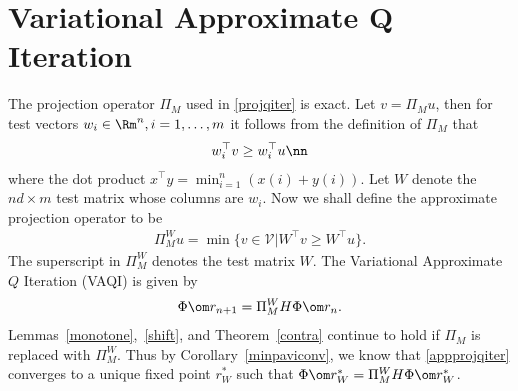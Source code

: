 \section{Variational Approximate Q Iteration}\label{weakproj}
The projection operator $\Pi_M$ used in \eqref{projqiter} is exact. Let $v=\Pi_M u$, then for test vectors $w_i \in \Rm^n, i=1,\ldots,m$ it follows from the definition of $\Pi_M$ that
\begin{align}
w_i^\top v\geq w_i^\top u\nn
\end{align}
where the dot product $x^\top y=\min^n_{i=1}(x(i)+y(i))$. Let $W$ denote the $nd\times m$ test matrix whose columns are $w_i$. Now we shall define the approximate projection operator to be
\begin{align}\label{appproj}
\Pi^W_M u=\min\{v \in \mathcal{V}| W^\top v\geq W^\top u \}.
\end{align}
The superscript in $\Pi_M^W$ denotes the test matrix $W$. The Variational Approximate $Q$ Iteration (VAQI) is given by
\begin{align}\label{appprojqiter}
\Phi \om r_{n+1}= \Pi^W_M H\Phi \om r_n.
\end{align}
Lemmas~\ref{monotone},~\ref{shift}, and Theorem~\ref{contra} continue to hold if $\Pi_M$ is replaced with $\Pi^W_M$. Thus by Corollary~\ref{minpaviconv}, we know that \eqref{appprojqiter} converges to a unique fixed point $r^*_W$ such that $\Phi \om r^*_W=\Pi^W_M H\Phi \om r^*_W$.\vspace{-2pt}
